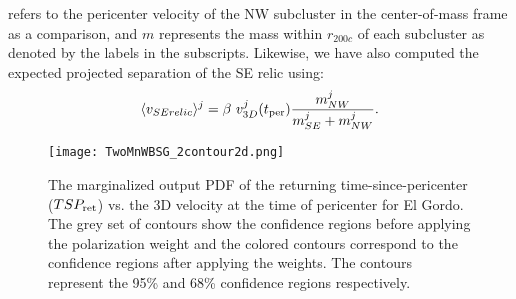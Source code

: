 refers to the pericenter velocity of
the NW subcluster in the center-of-mass frame as a comparison, and $m$
represents the mass within $r_{200c}$ of each subcluster as denoted by the
labels in the subscripts. 
Likewise, we have also computed the expected projected separation of the SE
relic using:  
\begin{equation}
	\label{eqn:SE_speed}
	\langle v_{SE relic} \rangle^j = \beta~v^j_{3D}(t_{\rm per}) \frac{m^j_{NW}}{m^j_{SE} + m^j_{NW}}. 
\end{equation}
\par 
\begin{figure}
	\texttt{[image: TwoMnWBSG\_2contour2d.png]}
	\caption{The marginalized output PDF of the returning time-since-pericenter
($TSP_{\rm ret}$) vs. the 3D velocity at the time of pericenter for El Gordo. The
grey set of contours show the confidence regions before applying the
polarization weight and the colored contours correspond to the confidence
regions after applying the weights. The contours represent the 95\% and
68\% confidence regions respectively. }
	\label{fig:TSP_v3D}
\end{figure}

